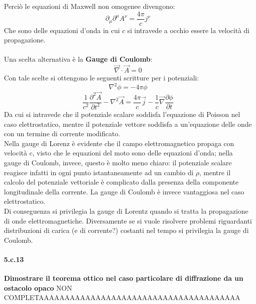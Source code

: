\documentclass[twoside]{article}
\begin{document}
Perciò le equazioni di Maxwell non omogenee divengono:
\begin{equation}
    \partial_\mu \partial^\mu A^\nu=\frac{4\pi}{c}j^\nu
\end{equation}
Che sono delle equazioni d'onda in cui $c$ si intravede a occhio essere la velocità di propagazione.
\\
\\
Una scelta alternativa è la \textbf{Gauge di Coulomb}:
\begin{equation}
    \vec{\nabla}\cdot \vec{A}=0
\end{equation}
Con tale scelte si ottengono le seguenti scritture per i potenziali:
\begin{equation}
    \nabla^2\phi=-4\pi\phi
\end{equation}
\begin{equation}
    \frac{1}{c^2}\frac{\partial^2\vec{A}}{\partial t^2}-\nabla^2\vec{A}=\frac{4\pi}{c}\vec{j}-\frac{1}{c}\vec{\nabla}\frac{\partial \phi}{\partial t}
\end{equation}
Da cui si intravede che il potenziale scalare soddisfa l'equazione di Poisson nel caso elettrostatico, mentre il potenziale vettore soddisfa a un'equazione delle onde con un termine di corrente modificato.
\\
Nella gauge di Lorenz è evidente che il campo elettromagnetico propaga con velocità c, visto che le equazioni del moto sono delle equazioni d’onda; nella gauge di Coulomb, invece, questo è molto meno chiaro: il potenziale scalare reagisce infatti in ogni punto istantaneamente ad un cambio di $\rho$, mentre il calcolo del
potenziale vettoriale è complicato dalla presenza della componente longitudinale della corrente. La gauge di Coulomb è invece vantaggiosa nel caso elettrostatico.\\
Di conseguenza si privilegia la gauge di Lorentz quando si tratta la propagazione di onde elettromagnetiche. Diversamente se si vuole risolvere problemi riguardanti distribuzioni di carica (e di corrente?) costanti nel tempo si privilegia la gauge di Coulomb.\\

\paragraph{5.c.13}\textbf{Dimostrare il teorema ottico nel caso particolare di diffrazione da un ostacolo opaco} NON COMPLETAAAAAAAAAAAAAAAAAAAAAAAAAAAAAAAAAAAAAAA\\
\\
\end{document}
